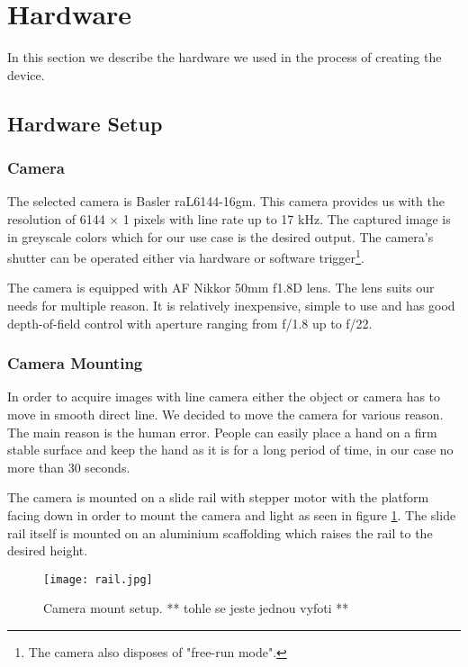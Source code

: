 \section{Hardware}
\label{sec:hw}

In this section we describe the hardware we used in the process of creating the device.

\subsection{Hardware Setup}


\subsubsection*{Camera}
The selected camera is Basler raL6144-16gm. This camera provides us with the resolution of 6144 $\times$ 1 pixels with line rate up to 17 kHz. The captured image is in greyscale colors which for our use case is the desired output. The camera's shutter can be operated either via hardware or software trigger\footnote{The camera also disposes of "free-run mode".}.

The camera is equipped with AF Nikkor 50mm f1.8D lens. The lens suits our needs for multiple reason. It is relatively inexpensive, simple to use and has good depth-of-field control with aperture ranging from f/1.8 up to f/22.

\subsubsection*{Camera Mounting}
In order to acquire images with line camera either the object or camera has to move in smooth direct line. We decided to move the camera for various reason. The main reason is the human error. People can easily place a hand on a firm stable surface and keep the hand as it is for a long period of time, in our case no more than 30 seconds.

The camera is mounted on a slide rail with stepper motor with the platform facing down in order to mount the camera and light as seen in figure \ref{fig:rail}. The slide rail itself is mounted on an aluminium scaffolding which raises the rail to the desired height.

\begin{figure}[h]
    \label{fig:rail}
    \centering
    \texttt{[image: rail.jpg]}
    \caption{Camera mount setup. ** tohle se jeste jednou vyfoti **}
\end{figure}

